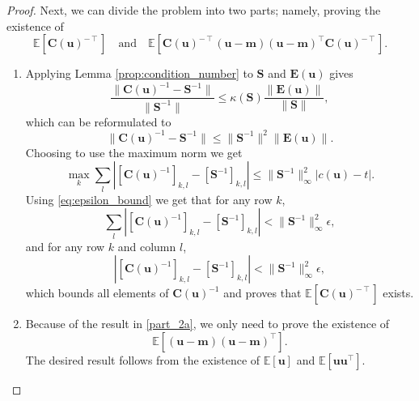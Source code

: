 \documentclass{article}
\theoremstyle{definition}
\theoremstyle{remark}
\begin{document}
\begin{proof}
    Next, we can divide the problem into two parts; namely, proving the
    existence of
    \[
      \mathbb{E}[\mathbf{C}(\mathbf{u})^{-\intercal}] \quad \text{and} \quad
      \mathbb{E}[\mathbf{C}(\mathbf{u})^{-\intercal}(\mathbf{u} -
      \mathbf{m})(\mathbf{u} -
      \mathbf{m})^\intercal\mathbf{C}(\mathbf{u})^{-\intercal}].
    \]
    \begin{enumerate} %
    \item \label{part_2a} Applying Lemma \ref{prop:condition_number} to
      $\mathbf{S}$ and $\mathbf{E}(\mathbf{u})$ gives
      \[
        \frac{\lVert \mathbf{C}(\mathbf{u})^{-1} - \mathbf{S}^{-1}
          \rVert}{\lVert \mathbf{S}^{-1} \rVert} \le
        \kappa(\mathbf{S})\frac{\lVert \mathbf{E}(\mathbf{u}) \rVert}{\lVert
          \mathbf{S} \rVert},
      \]
      which can be reformulated to
      \[
        \lVert \mathbf{C}(\mathbf{u})^{-1} - \mathbf{S}^{-1} \rVert \le \lVert
        \mathbf{S}^{-1} \rVert^2 \lVert \mathbf{E}(\mathbf{u}) \rVert.
      \]
      Choosing to use the maximum norm we get
      \[
        \max_k \sum_l \left| [\mathbf{C}(\mathbf{u})^{-1}]_{k,l} -
          [\mathbf{S}^{-1}]_{k,l} \right| \le \lVert \mathbf{S}^{-1}
        \rVert_\infty^2 |c(\mathbf{u}) - t|.
      \]
      Using \eqref{eq:epsilon_bound} we get that for any row $k$,
      \[
        \sum_l \left| [\mathbf{C}(\mathbf{u})^{-1}]_{k,l} -
          [\mathbf{S}^{-1}]_{k,l} \right| <
        \lVert \mathbf{S}^{-1} \rVert_\infty^2\epsilon,
      \]
      and for any row $k$ and column $l$,
      \[
        \left| [\mathbf{C}(\mathbf{u})^{-1}]_{k,l} - [\mathbf{S}^{-1}]_{k,l}
        \right| < \lVert \mathbf{S}^{-1} \rVert_\infty^2\epsilon,
      \]
      which bounds all elements of $\mathbf{C}(\mathbf{u})^{-1}$ and proves that
      $\mathbb{E}[\mathbf{C}(\mathbf{u})^{-\intercal}]$ exists.
    \item Because of the result in \ref{part_2a}, we only need to prove the
      existence of %
      \[
        \mathbb{E}[(\mathbf{u} - \mathbf{m})(\mathbf{u} -
        \mathbf{m})^\intercal].
      \]
      The desired result follows from the existence of $\mathbb{E}[\mathbf{u}]$
      and $\mathbb{E}[\mathbf{u}\mathbf{u}^\intercal]$.
    \end{enumerate}
\end{proof}
\end{document}
